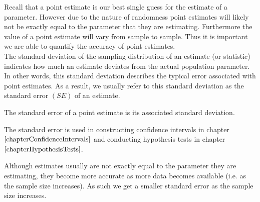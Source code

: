 Recall that a point estimate is our best single guess for the
estimate of a parameter. However due to the nature of randomness point estimates will likely not be exactly equal to the parameter that they are estimating. Furthermore the value of a point estimate will vary from sample to sample. Thus it is important we are able to quantify the accuracy of point estimates.\\

The standard deviation of the sampling distribution of an estimate (or statistic) indicates how much an estimate deviates from the actual population parameter. In other words, this standard deviation describes the typical error associated with point estimates. As a result, we usually refer to this standard deviation as the
standard error $(SE)$ of an estimate.

\begin{definition}
The standard error of a point estimate is its associated standard deviation.
\end{definition}

The standard error is used in constructing confidence intervals 
in chapter $\ref{chapterConfidenceIntervals}$
and conducting hypothesis tests in chapter $\ref{chapterHypothesisTests}$.

\begin{nt}
Although estimates usually are not exactly equal to the parameter they are estimating, they become more accurate as more data becomes available (i.e. as the sample size increases). As such we get a smaller standard error as the sample size increases.
\end{nt}
